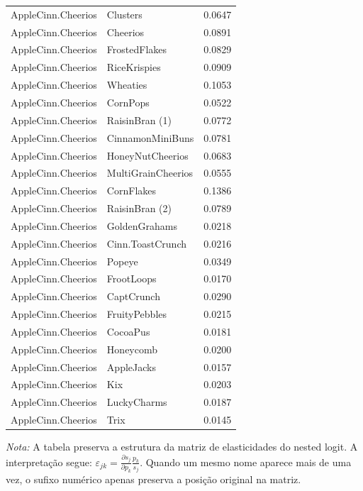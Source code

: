 \begin{table}[H]
\begin{tabular}{llr}
AppleCinn.Cheerios & Clusters & 0.0647 \\
AppleCinn.Cheerios & Cheerios & 0.0891 \\
AppleCinn.Cheerios & FrostedFlakes & 0.0829 \\
AppleCinn.Cheerios & RiceKrispies & 0.0909 \\
AppleCinn.Cheerios & Wheaties & 0.1053 \\
AppleCinn.Cheerios & CornPops & 0.0522 \\
AppleCinn.Cheerios & RaisinBran (1) & 0.0772 \\
AppleCinn.Cheerios & CinnamonMiniBuns & 0.0781 \\
AppleCinn.Cheerios & HoneyNutCheerios & 0.0683 \\
AppleCinn.Cheerios & MultiGrainCheerios & 0.0555 \\
AppleCinn.Cheerios & CornFlakes & 0.1386 \\
AppleCinn.Cheerios & RaisinBran (2) & 0.0789 \\
AppleCinn.Cheerios & GoldenGrahams & 0.0218 \\
AppleCinn.Cheerios & Cinn.ToastCrunch & 0.0216 \\
AppleCinn.Cheerios & Popeye & 0.0349 \\
AppleCinn.Cheerios & FrootLoops & 0.0170 \\
AppleCinn.Cheerios & CaptCrunch & 0.0290 \\
AppleCinn.Cheerios & FruityPebbles & 0.0215 \\
AppleCinn.Cheerios & CocoaPus & 0.0181 \\
AppleCinn.Cheerios & Honeycomb & 0.0200 \\
AppleCinn.Cheerios & AppleJacks & 0.0157 \\
AppleCinn.Cheerios & Kix & 0.0203 \\
AppleCinn.Cheerios & LuckyCharms & 0.0187 \\
AppleCinn.Cheerios & Trix & 0.0145 \\
\bottomrule
\end{tabular}

\vspace{0.3em}
\footnotesize
\textit{Nota:} A tabela preserva a estrutura da matriz de elasticidades do nested logit. A interpretação segue: $\varepsilon_{jk}=\frac{\partial s_j}{\partial p_k}\frac{p_k}{s_j}$. Quando um mesmo nome aparece mais de uma vez, o sufixo numérico apenas preserva a posição original na matriz.
\end{table}
\endgroup

